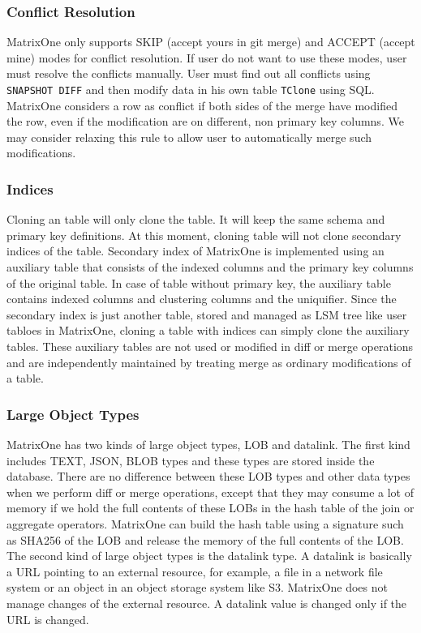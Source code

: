 \documentclass[sigconf,nonacm]{acmart} %
\begin{document}
\subsubsection{Conflict Resolution}
MatrixOne only supports SKIP (accept yours in git merge) and ACCEPT (accept mine)
modes for conflict resolution.  If user do not want to use these modes, user
must resolve the conflicts manually.  User must find out all conflicts using
\texttt{SNAPSHOT DIFF} and then modify data in his own table \texttt{TClone} 
using SQL.
MatrixOne considers a row as conflict if both sides of the merge have 
modified the row, even if the modification are on different, non primary key 
columns.  We may consider relaxing this rule to allow user to automatically 
merge such modifications.

\subsubsection{Indices}
Cloning an table will only clone the table.  It will keep 
the same schema and primary key definitions.  At this moment, cloning 
table will not clone secondary indices of the table.  
Secondary index 
of MatrixOne is implemented using an auxiliary table
that consists of the indexed columns and the primary key columns of 
the original table.  In case of table without primary key, the 
auxiliary table contains indexed columns and clustering columns 
and the uniquifier.
Since the secondary index is just another table, stored and managed as
LSM tree like user tabloes in MatrixOne, cloning 
a table with indices can simply clone the auxiliary tables.  
These auxiliary tables are not used or modified in diff or merge 
operations and are independently maintained by treating merge as
ordinary modifications of a table.

\subsubsection{Large Object Types}
MatrixOne has two kinds of large object types, LOB and datalink.
The first kind includes TEXT, JSON, BLOB types and these types are 
stored inside the database.  There are no difference between these 
LOB types and other data types when we perform diff or merge operations,
except that they may consume a lot of memory if we hold the full contents
of these LOBs in the hash table of the join or aggregate operators. 
MatrixOne can build the hash table using a signature such as SHA256 
of the LOB and release the memory of the full contents of the LOB.
The second kind of large object types is the datalink type.  A datalink 
is basically a URL pointing to an external resource, for example, a 
file in a network file system or an object in an object storage system 
like S3.  MatrixOne does not manage changes of the external resource.
A datalink value is changed only if the URL is changed.
\end{document}
